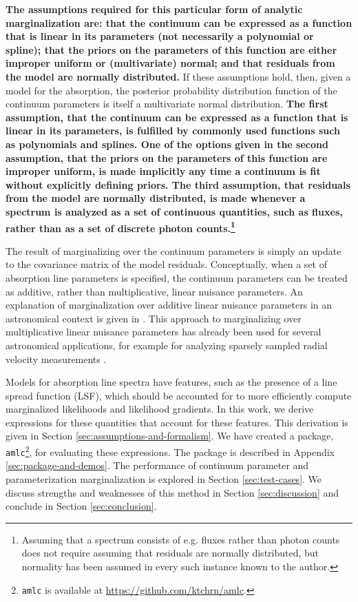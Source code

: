 \documentclass[trackchanges]{aastex62}
\newcommand{\pkgname}{\texttt{amlc}}
\begin{document}
{\color{red}\bf The assumptions required for this particular form of analytic marginalization are: that the continuum can be expressed as a function that is linear in its parameters (not necessarily a polynomial or spline); that the priors on the parameters of this function are either improper uniform or (multivariate) normal; and that residuals from the model are normally distributed.}
If these assumptions hold, then, given a model for the absorption, the posterior probability distribution function of the continuum parameters is itself a multivariate normal distribution.
{\color{red}\bf The first assumption, that the continuum can be expressed as a function that is linear in its parameters, is fulfilled by commonly used functions such as polynomials and splines.
One of the options given in the second assumption, that the priors on the parameters of this function are improper uniform, is made implicitly any time a continuum is fit without explicitly defining priors.
The third assumption, that residuals from the model are normally distributed, is made whenever a spectrum is analyzed as a set of continuous quantities, such as fluxes, rather than as a set of discrete photon counts.\footnote{Assuming that a spectrum consists of e.g. fluxes rather than photon counts does not require assuming that residuals are normally distributed, but normality has been assumed in every such instance known to the author.}}

The result of marginalizing over the continuum parameters is simply an update to the covariance matrix of the model residuals.
Conceptually, when a set of absorption line parameters is specified, the continuum parameters can be treated as additive, rather than multiplicative, linear nuisance parameters.
An explanation of marginalization over additive linear nuisance parameters in an astronomical context is given in \citet{2017RNAAS...1a...7L}.
This approach to marginalizing over multiplicative linear nuisance parameters has already been used for several astronomical applications, for example for analyzing sparsely sampled radial velocity measurements \citep{2017ApJ...837...20P}.

Models for absorption line spectra have features, such as the presence of a line spread function (LSF), which should be accounted for to more efficiently compute marginalized likelihoods and likelihood gradients.
In this work, we derive expressions for these quantities that account for these features.
This derivation is given in Section \ref{sec:assumptions-and-formalism}.
We have created a package, \pkgname\footnote{\pkgname{} is available at \url{https://github.com/ktchrn/amlc}.}, for evaluating these expressions.
The package is described in Appendix \ref{sec:package-and-demos}.
The performance of continuum parameter and parameterization marginalization is explored in Section \ref{sec:test-cases}.
We discuss strengths and weaknesses of this method in Section \ref{sec:discussion} and conclude in Section \ref{sec:conclusion}.
\end{document}
